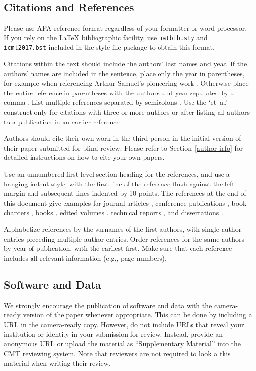 \documentclass{article}
\begin{document}
\subsection{Citations and References} 

Please use APA reference format regardless of your formatter
or word processor. If you rely on the \LaTeX\/ bibliographic 
facility, use {\tt natbib.sty} and {\tt icml2017.bst} 
included in the style-file package to obtain this format.

Citations within the text should include the authors' last names and
year. If the authors' names are included in the sentence, place only
the year in parentheses, for example when referencing Arthur Samuel's
pioneering work . Otherwise place the entire
reference in parentheses with the authors and year separated by a
comma \cite{Samuel59}. List multiple references separated by
semicolons \cite{kearns89,Samuel59,mitchell80}. Use the `et~al.'
construct only for citations with three or more authors or after
listing all authors to a publication in an earlier reference \cite{MachineLearningI}.

Authors should cite their own work in the third person
in the initial version of their paper submitted for blind review.
Please refer to Section~\ref{author info} for detailed instructions on how to
cite your own papers.

Use an unnumbered first-level section heading for the references, and 
use a hanging indent style, with the first line of the reference flush
against the left margin and subsequent lines indented by 10 points. 
The references at the end of this document give examples for journal
articles \cite{Samuel59}, conference publications \cite{langley00}, book chapters \cite{Newell81}, books \cite{DudaHart2nd}, edited volumes \cite{MachineLearningI}, 
technical reports \cite{mitchell80}, and dissertations \cite{kearns89}. 

Alphabetize references by the surnames of the first authors, with
single author entries preceding multiple author entries. Order
references for the same authors by year of publication, with the
earliest first. Make sure that each reference includes all relevant
information (e.g., page numbers).

\subsection{Software and Data}

We strongly encourage the publication of software and data with the
camera-ready version of the paper whenever appropriate.  This can be
done by including a URL in the camera-ready copy.  However, do not
include URLs that reveal your institution or identity in your
submission for review.  Instead, provide an anonymous URL or upload
the material as ``Supplementary Material'' into the CMT reviewing
system.  Note that reviewers are not required to look a this material
when writing their review.
\end{document}
